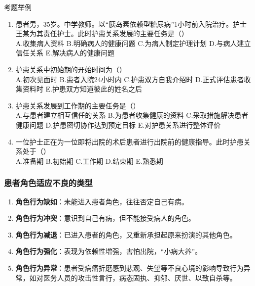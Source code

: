 \documentclass[11pt, a4paper]{ctexart}
\begin{document}
\begin{examplebox}{考题举例}
	\begin{enumerate}
		\item 患者男，35岁。中学教师。以“胰岛素依赖型糖尿病”1小时前入院治疗。护士王某为其责任护士。此时护患关系发展的主要任务是（\qquad）\\
		      A.收集病人资料 \quad B.明确病人的健康问题 \quad C.为病人制定护理计划 \quad D.与病人建立信任关系 \quad E.解决病人的健康问题
		\item 护患关系中初始期的开始时间为（\qquad）\\
		      A.初次见面时 \quad B.患者入院24小时内 \quad C.护患双方自我介绍时 \quad D.正式评估患者收集资料时 \quad E.护患双方知道彼此的姓名之后
		\item 护患关系发展到工作期的主要任务是（\qquad）\\
		      A.与患者建立相互信任的关系 \quad B.为患者收集健康的资料 \quad C.采取措施解决患者健康问题 \quad D.护患密切协作达到预定目标 \quad E.对护患关系进行整体评价
		\item 一位护士正在为一位即将出院的术后患者进行出院前的健康指导。此时护患关系处于（\qquad）\\
		      A.准备期 \quad B.初始期 \quad C.工作期 \quad D.结束期 \quad E.熟悉期
	\end{enumerate}
\end{examplebox}

\subsubsection{患者角色适应不良的类型}
\begin{enumerate}
	\item \textbf{角色行为缺如}：未能进入患者角色，往往否定自己有病。
	\item \textbf{角色行为冲突}：意识到自己有病，但不能接受病人的角色。
	\item \textbf{角色行为减退}：已进入患者的角色，又重新承担起原来扮演的其他角色。
	\item \textbf{角色行为强化}：表现为依赖性增强，害怕出院，“小病大养”。
	\item \textbf{角色行为异常}：患者受病痛折磨感到悲观、失望等不良心境的影响导致行为异常，如对医务人员的攻击性言行，病态固执、抑郁、厌世、以致自杀等。
\end{enumerate}
\end{document}
